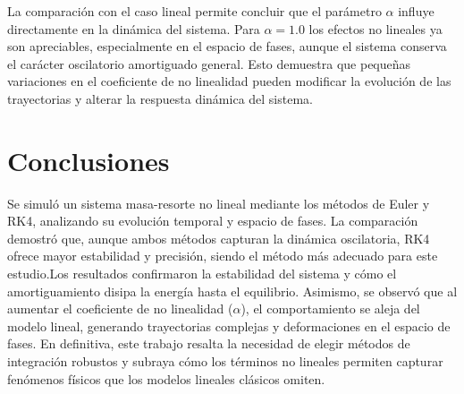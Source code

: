 \documentclass[12pt, a4paper]{article}
\begin{document}
La comparación con el caso lineal permite concluir que el parámetro \(\alpha\) influye directamente en la dinámica del sistema. Para \(\alpha = 1.0\) los efectos no lineales ya son apreciables, especialmente en el espacio de fases, aunque el sistema conserva el carácter oscilatorio amortiguado general. Esto demuestra que pequeñas variaciones en el coeficiente de no linealidad pueden modificar la evolución de las trayectorias y alterar la respuesta dinámica del sistema.

\section{Conclusiones}

Se simuló un sistema masa-resorte no lineal mediante los métodos de Euler y RK4, analizando su evolución temporal y espacio de fases. La comparación demostró que, aunque ambos métodos capturan la dinámica oscilatoria, RK4 ofrece mayor estabilidad y precisión, siendo el método más adecuado para este estudio.Los resultados confirmaron la estabilidad del sistema y cómo el amortiguamiento disipa la energía hasta el equilibrio. Asimismo, se observó que al aumentar el coeficiente de no linealidad ($\alpha$), el comportamiento se aleja del modelo lineal, generando trayectorias complejas y deformaciones en el espacio de fases. En definitiva, este trabajo resalta la necesidad de elegir métodos de integración robustos y subraya cómo los términos no lineales permiten capturar fenómenos físicos que los modelos lineales clásicos omiten.
\end{document}
